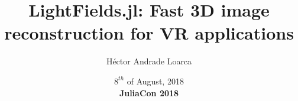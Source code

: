 \title[LightFields.jl]{LightFields.jl: Fast 3D image reconstruction for VR applications}
\author{H\'ector Andrade Loarca}
\date[JuliaCon 2018]{$8^{th}$ of August, 2018 \\ \textbf{JuliaCon 2018}}

\newcommand{\mylogo}{\texttt{[image: images/bms-logo-button.png]}}

\begin{frame}[plain]
	\titlepage
\end{frame}

